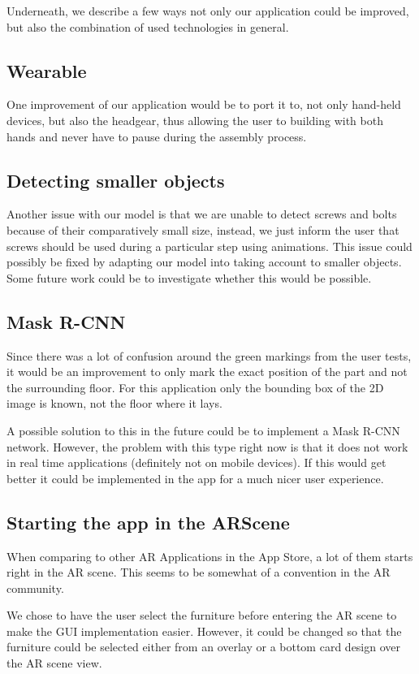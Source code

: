 Underneath, we describe a few ways not only our application could be improved, but also
the combination of used technologies in general.
\subsection{Wearable}
One improvement of our application would be to port it to, not only hand-held devices, but also the headgear, thus allowing the user to building with both hands and never have to pause during the assembly process.

\subsection{Detecting smaller objects}
Another issue with our model is that we are unable to detect screws and bolts because of their 
comparatively small size, instead, we just inform the user that screws should be used during a particular step using animations.
This issue could possibly be fixed by adapting our model into taking account to smaller objects.
Some future work could be to investigate whether this would be possible.

\subsection{Mask R-CNN}
Since there was a lot of confusion around the green markings from the user tests, it would be an
improvement to only mark the exact position of the part and not the surrounding floor.
For this application only the bounding box of the 2D image is known, not the floor where it lays.

A possible solution to this in the future could be to implement a Mask R-CNN network. However, 
the problem with this type right now is that it does not work in real time applications (definitely not on mobile devices).
If this would get better it could be implemented in the app for a much nicer user experience.

\subsection{Starting the app in the ARScene}
When comparing to other AR Applications in the App Store, a lot of them starts right in the AR 
scene. This seems to be somewhat of a convention in the AR community.

We chose to have the user select the furniture before entering the AR scene to make the GUI
implementation easier. However, it could be changed so that the furniture could be selected
either from an overlay or a bottom card design over the AR scene view.

